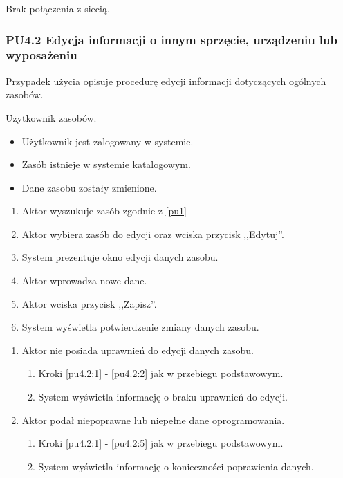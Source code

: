 Brak połączenia z siecią.

\subsubsection{PU4.2 Edycja informacji o innym sprzęcie, urządzeniu lub wyposażeniu}

Przypadek użycia opisuje procedurę edycji informacji dotyczących ogólnych zasobów.

Użytkownik zasobów.

\begin{itemize}
\item Użytkownik jest zalogowany w systemie.
\item Zasób istnieje w systemie katalogowym.
\end{itemize}

\begin{itemize}
\item Dane zasobu zostały zmienione.
\end{itemize}

\begin{enumerate}
\item \label{pu4.2:1} Aktor wyszukuje zasób zgodnie z \ref{pu1}
\item \label{pu4.2:2} Aktor wybiera zasób do edycji oraz wciska przycisk ,,Edytuj''.
\item System prezentuje okno edycji danych zasobu.
\item Aktor wprowadza nowe dane.
\item \label{pu4.2:5} Aktor wciska przycisk ,,Zapisz''.
\item System wyświetla potwierdzenie zmiany danych zasobu.
\end{enumerate}

\begin{enumerate}
\item Aktor nie posiada uprawnień do edycji danych zasobu.
	\begin{enumerate}[label*=\arabic*.]
		\item Kroki \ref{pu4.2:1} - \ref{pu4.2:2} jak w przebiegu podstawowym.
		\item System wyświetla informację o braku uprawnień do edycji.
	\end{enumerate}
\item Aktor podał niepoprawne lub niepełne dane oprogramowania.
	\begin{enumerate}[label*=\arabic*.]
		\item Kroki \ref{pu4.2:1} - \ref{pu4.2:5} jak w przebiegu podstawowym.
		\item System wyświetla informację o konieczności poprawienia danych.
	\end{enumerate}
\end{enumerate}

